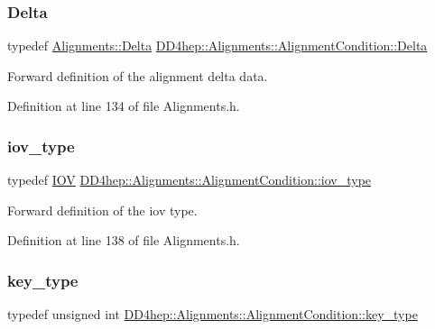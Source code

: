 \subsubsection{\texorpdfstring{Delta}{Delta}}
{\footnotesize\ttfamily typedef \hyperlink{class_d_d4hep_1_1_alignments_1_1_delta}{Alignments\+::\+Delta} \hyperlink{class_d_d4hep_1_1_alignments_1_1_alignment_condition_a7a0f38a79212c07c444c8c8cd512bbd6}{D\+D4hep\+::\+Alignments\+::\+Alignment\+Condition\+::\+Delta}}



Forward definition of the alignment delta data. 



Definition at line 134 of file Alignments.\+h.

\hypertarget{class_d_d4hep_1_1_alignments_1_1_alignment_condition_a95e1d25777aca1542555e477c8233968}{}\label{class_d_d4hep_1_1_alignments_1_1_alignment_condition_a95e1d25777aca1542555e477c8233968} 
\subsubsection{\texorpdfstring{iov\+\_\+type}{iov\_type}}
{\footnotesize\ttfamily typedef \hyperlink{class_d_d4hep_1_1_i_o_v}{I\+OV} \hyperlink{class_d_d4hep_1_1_alignments_1_1_alignment_condition_a95e1d25777aca1542555e477c8233968}{D\+D4hep\+::\+Alignments\+::\+Alignment\+Condition\+::iov\+\_\+type}}



Forward definition of the iov type. 



Definition at line 138 of file Alignments.\+h.

\hypertarget{class_d_d4hep_1_1_alignments_1_1_alignment_condition_a6ae3e6421b162cdd440b60d5a4e1ed92}{}\label{class_d_d4hep_1_1_alignments_1_1_alignment_condition_a6ae3e6421b162cdd440b60d5a4e1ed92} 
\subsubsection{\texorpdfstring{key\+\_\+type}{key\_type}}
{\footnotesize\ttfamily typedef unsigned int \hyperlink{class_d_d4hep_1_1_alignments_1_1_alignment_condition_a6ae3e6421b162cdd440b60d5a4e1ed92}{D\+D4hep\+::\+Alignments\+::\+Alignment\+Condition\+::key\+\_\+type}}



